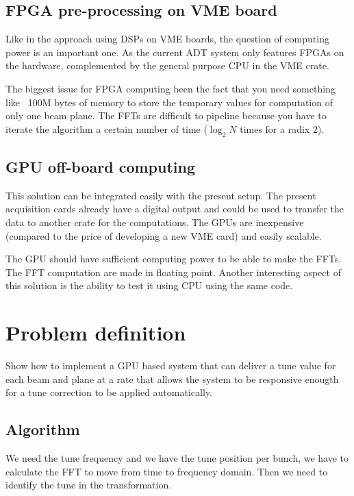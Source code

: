 \subsection{FPGA pre-processing on VME board}

Like in the approach using \glspl{DSP} on VME boards, the question of computing power is an important one. As the current ADT system only features \glspl{FPGA} on the hardware, complemented by the general purpose \gls{CPU} in the \gls{VME} crate.  

The biggest issue for FPGA computing been the fact that you need something like ~100M bytes of memory to store the temporary values for computation of only one beam plane. The \glspl{FFT} are difficult to pipeline because you have to iterate the algorithm a certain number of time ($\log_{2} N$ times for a radix 2).

\subsection{GPU off-board computing}

This solution can be integrated easily with the present setup. The present acquisition cards already have a digital output and could be used to transfer the data to another crate for the computations. The \glspl{GPU} are inexpensive (compared to the price of developing a new \gls{VME} card) and easily scalable. 

The \gls{GPU} should have sufficient computing power to be able to make the \glspl{FFT}. The \gls{FFT} computation are made in floating point. Another interesting aspect of this solution is the ability to test it using \gls{CPU} using the same code.

\section{Problem definition}

Show how to implement a GPU based system that can deliver a tune value for each beam and plane at a rate that allows the system to be responsive enougth for a tune correction to be applied automatically. 

   \subsection{Algorithm}

   We need the tune frequency and we have the tune position per bunch, we have to calculate the FFT to move from time to frequency domain. Then we need to identify the tune in the transformation.

